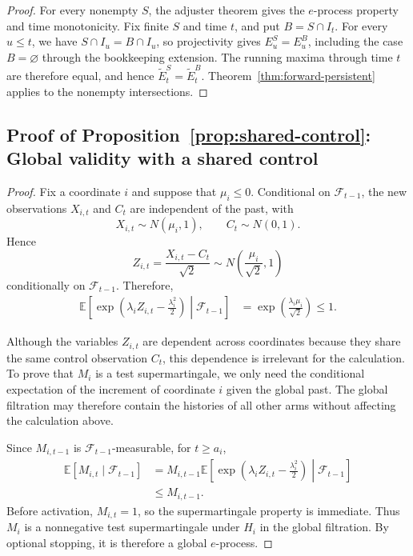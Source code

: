 \documentclass[11pt]{article}
\numberwithin{equation}{section}
\theoremstyle{plain}
\theoremstyle{definition}
\newcommand{\E}{\mathbb E}
\newcommand{\F}{\mathcal F}
\begin{document}
\begin{proof}
For every nonempty $S$, the adjuster theorem gives the $e$-process property and time monotonicity. Fix finite $S$ and time $t$, and put $B=S\cap I_t$. For every $u\leq t$, we have $S\cap I_u=B\cap I_u$, so projectivity gives $E_u^S=E_u^B$, including the case $B=\varnothing$ through the bookkeeping extension. The running maxima through time $t$ are therefore equal, and hence $\widetilde E_t^S=\widetilde E_t^B$. Theorem~\ref{thm:forward-persistent} applies to the nonempty intersections.
\end{proof}

\subsection{Proof of Proposition~\ref{prop:shared-control}: Global validity with a shared control}\label{app:proof-shared-control}

\begin{proof}
	Fix a coordinate $i$ and suppose that $\mu_i\leq0$. Conditional on $\F_{t-1}$, the new observations $X_{i,t}$ and $C_t$ are independent of the past, with
	\begin{equation}
		X_{i,t}\sim N(\mu_i,1),
		\qquad
		C_t\sim N(0,1).
	\end{equation}
	Hence
	\begin{equation}
		Z_{i,t}
		=\frac{X_{i,t}-C_t}{\sqrt{2}}
		\sim N\left(\frac{\mu_i}{\sqrt{2}},1\right)
	\end{equation}
	conditionally on $\F_{t-1}$. Therefore,
	\begin{align}
		\E\left[
		\exp\left(\lambda_i Z_{i,t}-\frac{\lambda_i^2}{2}\right)
		\middle|\F_{t-1}
		\right]
		&=
		\exp\left(\frac{\lambda_i\mu_i}{\sqrt{2}}\right)
		\leq 1.
	\end{align}
	
	Although the variables $Z_{i,t}$ are dependent across coordinates because they share the same control observation $C_t$, this dependence is irrelevant for the calculation. To prove that $M_i$ is a test supermartingale, we only need the conditional expectation of the increment of coordinate $i$ given the global past. The global filtration may therefore contain the histories of all other arms without affecting the calculation above.
	
	Since $M_{i,t-1}$ is $\F_{t-1}$-measurable, for $t\geq a_i$,
	\begin{align}
		\E[M_{i,t}\mid\F_{t-1}]
		&=
		M_{i,t-1}
		\E\left[
		\exp\left(\lambda_i Z_{i,t}-\frac{\lambda_i^2}{2}\right)
		\middle|\F_{t-1}
		\right] \\
		&\leq M_{i,t-1}.
	\end{align}
	Before activation, $M_{i,t}=1$, so the supermartingale property is immediate. Thus $M_i$ is a nonnegative test supermartingale under $H_i$ in the global filtration. By optional stopping, it is therefore a global $e$-process.
\end{proof}
\end{document}

